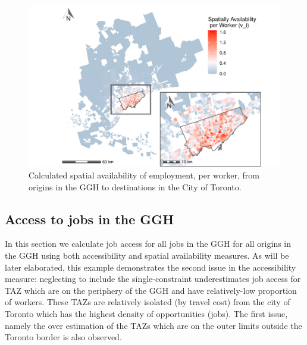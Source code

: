 \documentclass[]{elsarticle} %
\begin{document}
\begin{figure}
\includegraphics[width=1\linewidth]{Spatial-Availability_files/figure-latex/plot-avail-Toronto-TTS-per-worker-1} \caption{\label{fig:plot-avail-Toronto-TTS-per-worker}Calculated spatial availability of employment, per worker, from origins in the GGH to destinations in the City of Toronto.}\label{fig:plot-avail-Toronto-TTS-per-worker}
\end{figure}

\newpage

\hypertarget{access-to-jobs-in-the-ggh}{%
\subsection{Access to jobs in the GGH}\label{access-to-jobs-in-the-ggh}}

In this section we calculate job access for all jobs in the GGH for all
origins in the GGH using both accessibility and spatial availability
measures. As will be later elaborated, this example demonstrates the
second issue in the accessibility measure: neglecting to include the
single-constraint underestimates job access for TAZ which are on the
periphery of the GGH and have relatively-low proportion of workers.
These TAZs are relatively isolated (by travel cost) from the city of
Toronto which has the highest density of opportunities (jobs). The first
issue, namely the over estimation of the TAZs which are on the outer
limits outside the Toronto border is also observed.
\end{document}

